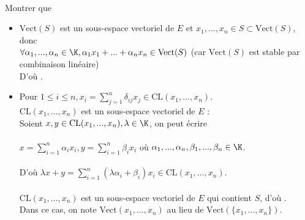 \documentclass[12pt, a4paper]{report}
\begin{document}
\begin{remarque}{}
 \\
Montrer que  \\

\begin{itemize}
	\item $\text{Vect}(S)$ est un sous-espace vectoriel de $E$ et $x_1,...,x_n  \in S \subset \text{Vect}(S)$, donc \\
		$\forall \alpha_1,...,\alpha_n \in \K, \alpha_1x_1+...+\alpha_nx_n \in \text{Vect}(S)$ (car $\text{Vect}(S)$ est stable par combinaison linéaire) \\
		D'où . \\
	\item Pour $1 \le i \le n, x_i = \displaystyle{\sum_{j=1}^n \delta_{ij}x_j \in \text{CL}(x_1,...,x_n)}$. \\
		$\text{CL}(x_1,...,x_n)$ est un sous-espace vectoriel de $E$ : \\
	Soient $x,y \in \text{CL}(x_1,...,x_n), \lambda \in \K$, on peut écrire \\ \\
	$x = \displaystyle{\sum_{i=1}^n\alpha_ix_i, y = \sum_{i=1}^n \beta_ix_i}$ où $\alpha_1,...,\alpha_n,\beta_1,...,\beta_n \in \K$. \\ \\
	D'où $\lambda x + y = \displaystyle{\sum_{i=1}^n (\lambda \alpha_i + \beta_i)x_i} \in \text{CL}(x_1,...,x_n)$. \\ \\
	$\text{CL}(x_1,...,x_n)$ est un sous-espace vectoriel de $E$ qui contient $S$, d'où . \\
	Dans ce cas, on note $\text{Vect}(x_1,...,x_n)$ au lieu de $\text{Vect}(\{x_1,...,x_n\})$.

\end{itemize}
\end{remarque}
\end{document}
